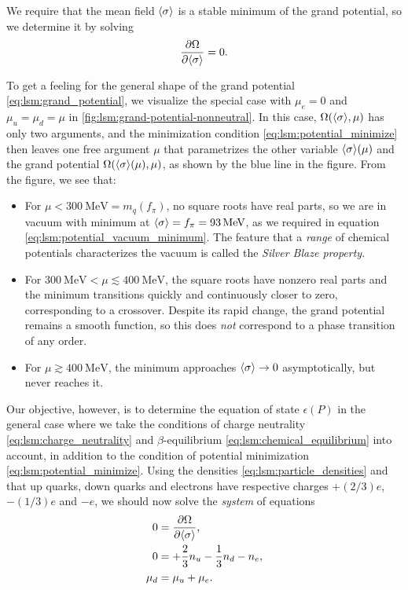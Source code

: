 We require that the mean field $\langle \sigma \rangle$ is a stable minimum of the grand potential,
so we determine it by solving
\begin{equation}
	\pdv{\Omega}{ \langle \sigma \rangle} = 0.
\label{eq:lsm:potential_minimize}
\end{equation}

To get a feeling for the general shape of the grand potential \eqref{eq:lsm:grand_potential}, we visualize the special case with $\mu_e = 0$ and $\mu_u = \mu_d = \mu$ in \cref{fig:lsm:grand-potential-nonneutral}.
In this case, $\Omega(\langle \sigma \rangle,\mu)$ has only two arguments, and the minimization condition \eqref{eq:lsm:potential_minimize} then leaves one free argument $\mu$ that parametrizes the other variable $\langle \sigma \rangle(\mu)$ and the grand potential $\Omega(\langle \sigma \rangle(\mu),\mu)$, as shown by the blue line in the figure.
From the figure, we see that:
\begin{itemize}
\item For $\mu < \SI{300}{\mega\electronvolt} = m_q(f_\pi)$, no square roots have real parts, so we are in vacuum with minimum at $\langle \sigma \rangle = f_\pi = \SI{93}{\mega\electronvolt}$, as we required in equation \eqref{eq:lsm:potential_vacuum_minimum}.
      The feature that a \emph{range} of chemical potentials characterizes the vacuum is called the \emph{Silver Blaze property}.
\item For $\SI{300}{\mega\electronvolt} < \mu \lesssim \SI{400}{\mega\electronvolt}$, the square roots have nonzero real parts and the minimum transitions quickly and continuously closer to zero, corresponding to a crossover.
      Despite its rapid change, the grand potential remains a smooth function, so this does \emph{not} correspond to a phase transition of any order.
\item For $\mu \gtrsim \SI{400}{\mega\electronvolt}$, the minimum approaches $\langle \sigma \rangle \rightarrow 0$ asymptotically, but never reaches it.
\end{itemize}
Our objective, however, is to determine the equation of state $\epsilon(P)$ in the general case where we take the conditions of charge neutrality \eqref{eq:lsm:charge_neutrality} and $\beta$-equilibrium \eqref{eq:lsm:chemical_equilibrium} into account, in addition to the condition of potential minimization \eqref{eq:lsm:potential_minimize}.
Using the densities \eqref{eq:lsm:particle_densities} and that up quarks, down quarks and electrons have respective charges $+(2/3)e$, $-(1/3)e$ and $-e$, we should now solve the \emph{system} of equations
\begin{subequations}
\begin{align}
	0 &= \pdv{\Omega}{ \langle \sigma \rangle} , \label{eq:lsm:minsys_min} \\
	0 &= +\frac23 n_u - \frac13 n_d - n_e , \label{eq:lsm:minsys_charge} \\
	\mu_d &= \mu_u + \mu_e . \label{eq:lsm:minsys_equilibrium}
\end{align}%
\label{eq:lsm:minsys}%
\end{subequations}%

